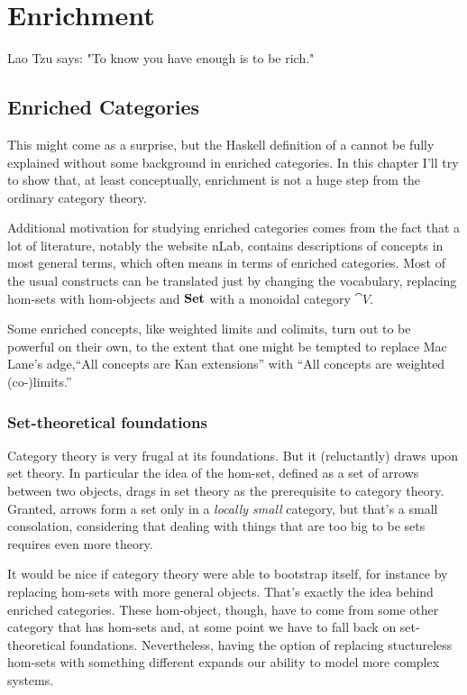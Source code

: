 \documentclass[DaoFP]{subfiles}
\begin{document}
\setcounter{chapter}{19}

\chapter{Enrichment}

Lao Tzu says: "To know you have enough is to be rich." 

\section{Enriched Categories}

This might come as a surprise, but the Haskell definition of a  cannot be fully explained without some background in enriched categories. In this chapter I'll try to show that, at least conceptually, enrichment is not a huge step from the ordinary category theory. 

Additional motivation for studying enriched categories comes from the fact that a lot of literature, notably the website nLab, contains descriptions of concepts in most general terms, which often means in terms of enriched categories. Most of the usual constructs can be translated just by changing the vocabulary, replacing hom-sets with hom-objects and $\mathbf{Set}$ with a monoidal category $\cat V$. 

Some enriched concepts, like weighted limits and colimits, turn out to be powerful on their own, to the extent that one might be tempted to replace Mac Lane's adge,``All concepts are Kan extensions'' with ``All concepts are weighted (co-)limits.''

\subsection{Set-theoretical foundations}

Category theory is very frugal at its foundations. But it (reluctantly) draws upon set theory. In particular the idea of the hom-set, defined as a set of arrows between two objects, drags in set theory as the prerequisite to category theory. Granted, arrows form a set only in a \emph{locally small} category, but that's a small consolation, considering that dealing with things that are too big to be sets requires even more theory. 

It would be nice if category theory were able to bootstrap itself, for instance by replacing hom-sets with more general objects. That's exactly the idea behind enriched categories. These hom-object, though, have to come from some other category that has hom-sets and, at some point we have to fall back on set-theoretical foundations. Nevertheless, having the option of replacing stuctureless hom-sets with something different expands our ability to model more complex systems.
\end{document}
